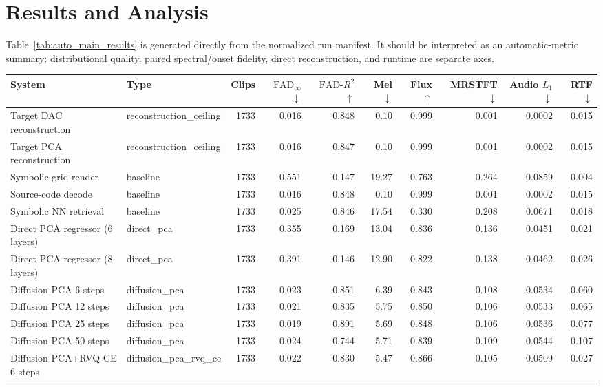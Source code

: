 \documentclass[11pt]{article}
\begin{document}
\section{Results and Analysis}
Table~\ref{tab:auto_main_results} is generated directly from the normalized run manifest. It should be interpreted as an automatic-metric summary: distributional quality, paired spectral/onset fidelity, direct reconstruction, and runtime are separate axes.

\begin{table}[t]
\centering
\small
\setlength{\tabcolsep}{3pt}
\begin{tabular}{llrrrrrrrr}
\toprule
System & Type & Clips & $\mathrm{FAD}_{\infty}$ $\downarrow$ & $\mathrm{FAD}\text{-}R^2$ $\uparrow$ & Mel $\downarrow$ & Flux $\uparrow$ & MRSTFT $\downarrow$ & Audio $L_1$ $\downarrow$ & RTF $\downarrow$ \\
\midrule
Target DAC reconstruction & reconstruction\_ceiling & 1733 & 0.016 & 0.848 & 0.10 & 0.999 & 0.001 & 0.0002 & 0.015 \\
Target PCA reconstruction & reconstruction\_ceiling & 1733 & 0.016 & 0.847 & 0.10 & 0.999 & 0.001 & 0.0002 & 0.015 \\
Symbolic grid render & baseline & 1733 & 0.551 & 0.147 & 19.27 & 0.763 & 0.264 & 0.0859 & 0.004 \\
Source-code decode & baseline & 1733 & 0.016 & 0.848 & 0.10 & 0.999 & 0.001 & 0.0002 & 0.015 \\
Symbolic NN retrieval & baseline & 1733 & 0.025 & 0.846 & 17.54 & 0.330 & 0.208 & 0.0671 & 0.018 \\
Direct PCA regressor (6 layers) & direct\_pca & 1733 & 0.355 & 0.169 & 13.04 & 0.836 & 0.136 & 0.0451 & 0.021 \\
Direct PCA regressor (8 layers) & direct\_pca & 1733 & 0.391 & 0.146 & 12.90 & 0.822 & 0.138 & 0.0462 & 0.026 \\
Diffusion PCA 6 steps & diffusion\_pca & 1733 & 0.023 & 0.851 & 6.39 & 0.843 & 0.108 & 0.0534 & 0.060 \\
Diffusion PCA 12 steps & diffusion\_pca & 1733 & 0.021 & 0.835 & 5.75 & 0.850 & 0.106 & 0.0533 & 0.065 \\
Diffusion PCA 25 steps & diffusion\_pca & 1733 & 0.019 & 0.891 & 5.69 & 0.848 & 0.106 & 0.0536 & 0.077 \\
Diffusion PCA 50 steps & diffusion\_pca & 1733 & 0.024 & 0.744 & 5.71 & 0.839 & 0.109 & 0.0544 & 0.107 \\
Diffusion PCA+RVQ-CE 6 steps & diffusion\_pca\_rvq\_ce & 1733 & 0.022 & 0.830 & 5.47 & 0.866 & 0.105 & 0.0509 & 0.027 \\

\end{tabular}
\end{table}
\end{document}

